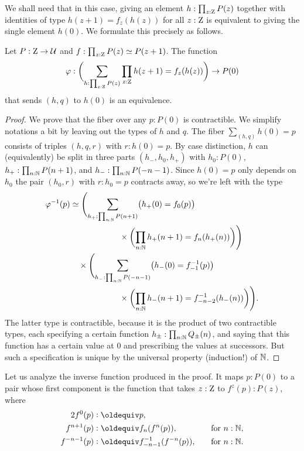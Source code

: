 \documentclass[a4,12pt]{amsart}
\begin{document}
We shall need that in this case, giving an element $h:\prod_{z:\mathrm{Z}}P(z)$
together with identities of type $h(z+1) = f_z(h(z))$ for all $z:\mathrm{Z}$
is equivalent to giving the single element $h(0)$.
We formulate this precisely as follows.

\begin{theorem}\label{thm:integers-univ-symm}
  Let $P : \mathrm{Z} \to \mathcal{U}$ and $f : \prod_{z:\mathrm{Z}}P(z) \simeq P(z+1)$. The function
  \[
    \varphi : \biggl(\sum_{h:\prod_{z:\mathrm{Z}}P(z)}\prod_{z:\mathrm{Z}}h(z+1) = f_z(h(z))\biggr) \to P(0)
  \]
  that sends $(h,q)$ to $h(0)$ is an equivalence.
\end{theorem}
\begin{proof}
  We prove that the fiber over any $p : P(0)$ is contractible.
  We simplify notations a bit by leaving out the types of $h$ and $q$.
  The fiber $\sum_{(h,q)} h(0)=p$ consists of triples $(h,q,r)$ with $r : h(0) = p$.
  By case distinction, $h$ can (equivalently) be split in three parts $(h_-,h_0,h_+)$
  with $h_0 : P(0)$, $h_+ : \prod_{n:\mathbb{N}}P(n+1)$,  and $h_- : \prod_{n:\mathbb{N}} P(-n-1)$. 
  Since $h(0)=p$ only depends on $h_0$ the pair $(h_0,r)$ with  $r : h_0 = p$
  contracts away, so we're left with the type
  \begin{align*}
    \varphi^{-1}(p)
    &\simeq
      \Biggl(\sum_{h_+ : \prod_{n:\mathbb{N}}P(n+1)}
      \bigl(h_+(0) = f_0(p)\bigr) \\
    &\qquad\qquad\qquad
      \times \biggl(\prod_{n:\mathbb{N}}h_+(n+1) = f_n(h_+(n))\biggr)\Biggr) \\
    &\quad\times
      \Biggl(\sum_{h_- : \prod_{n:\mathbb{N}}P(-n-1)}
      \bigl(h_-(0) = f_{-1}^{-1}(p)\bigr) \\
    &\qquad\qquad\qquad
      \times \biggl(\prod_{n:\mathbb{N}}h_-(n+1) = f_{-n-2}^{-1}(h_-(n))\biggr)\Biggr).
  \end{align*}
  The latter type is contractible, because it is the product of two contractible types,
  each specifying a certain function $h_{\pm}:\prod_{n:\mathbb{N}}Q_{\pm}(n)$,
  and saying that this function has a certain value at $0$
  and prescribing the values at successors.
  But such a specification is unique by the universal property (induction!) of $\mathbb{N}$.
\end{proof}
Let us analyze the inverse function produced in the proof.
It maps $p : P(0)$ to a pair whose first component
is the function that takes $z:\mathrm{Z}$ to $f^z(p):P(z)$, where
\begin{alignat*}2
  f^0(p) &\defeq p, && \\
  f^{n+1}(p) &\defeq f_n(f^n(p)),&\quad&\text{for $n:\NN$,} \\
  f^{-n-1}(p) &\defeq f_{-n-1}^{-1}(f^{-n}(p)),&\quad&\text{for $n:\NN$.}
\end{alignat*}
\end{document}
